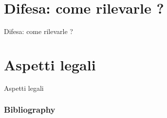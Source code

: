 \documentclass[11pt]{beamer}
\begin{document}
\section{Difesa: come rilevarle ?}

\begin{frame}
\begin{center}
\Huge
Difesa: come rilevarle ?
\end{center}
\end{frame}


\section{Aspetti legali}

\begin{frame}
\begin{center}
\Huge
Aspetti legali
\end{center}
\end{frame}





\begin{frame}[t,allowframebreaks]
\frametitle{Bibliography}
\printbibliography
\end{frame}
\end{document}

